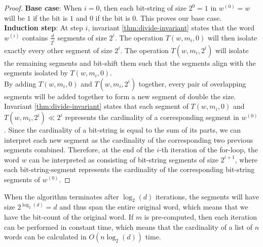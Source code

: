 \begin{proof}
    \textbf{Base case}: When $i=0$, then each bit-string of size $2^0=1$ in $w^{(0)} = w$ will be $1$ if the bit is $1$ and $0$ if the bit is $0$. This proves our base case. \\
    \textbf{Induction step}:
    At step $i$, invariant \ref{thm:divide-invariant} states that the word $w^{(i)}$ contains $\frac{d}{2^i}$ segments of size $2^i$. The operation $T(w, m_i, 0)$ will then isolate exactly every other segment of size $2^i$. The operation $T(w, m_i, 2^i)$ will isolate the remaining segments and bit-shift them such that the segments align with the segments isolated by $T(w, m_i, 0)$.\\
    By adding $T(w, m_i, 0)$ and $T(w, m_i, 2^i)$ together, every pair of overlapping segments will be added together to form a new segment of double the size. Invariant \ref{thm:divide-invariant} states that each segment of $T(w, m_i, 0)$ and $T(w, m_i, 2^i) \ll 2^i$ represents the cardinality of a corresponding segment in $w^{(0)}$. Since the cardinality of a bit-string is equal to the sum of its parts, we can interpret each new segment as the cardinality of the corresponding two previous segments combined. Therefore, at the end of the $i$-th iteration of the for-loop, the word $w$ can be interpreted as consisting of bit-string segments of size $2^{i+1}$, where each bit-string-segment represents the cardinality of the corresponding bit-string segments of $w^{(0)}$.
\end{proof}
When the algorithm terminates after $\log_2(d)$ iterations, the segments will have size $2^{\log_2{(d)}} = d$ and thus span the entire original word, which means that we have the bit-count of the original word. If $m$ is pre-computed, then each iteration can be performed in constant time, which means that the cardinality of a list of $n$ words can be calculated in $O(n\log_2{(d)})$ time.%

